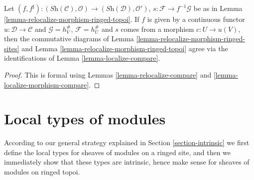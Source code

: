 \begin{lemma}
\label{lemma-relocalize-morphism-compare}
Let
$(f, f^\sharp) :
(\textit{Sh}(\mathcal{C}), \mathcal{O})
\to
(\textit{Sh}(\mathcal{D}), \mathcal{O}')$,
$s : \mathcal{F} \to f^{-1}\mathcal{G}$ be as in
Lemma \ref{lemma-relocalize-morphism-ringed-topoi}.
If $f$ is given by a continuous functor
$u : \mathcal{D} \to \mathcal{C}$
and $\mathcal{G} = h_V^\#$,
$\mathcal{F} = h_U^\#$ and $s$ comes from a morphism
$c : U \to u(V)$, then
the commutative diagrams of
Lemma \ref{lemma-relocalize-morphism-ringed-sites}
and
Lemma \ref{lemma-relocalize-morphism-ringed-topoi}
agree via the identifications of
Lemma \ref{lemma-localize-compare}.
\end{lemma}

\begin{proof}
This is formal using
Lemmas \ref{lemma-relocalize-compare} and
\ref{lemma-localize-morphism-compare}.
\end{proof}

















\section{Local types of modules}
\label{section-local}

\noindent
According to our general strategy explained in Section \ref{section-intrinsic}
we first define the local types for sheaves of modules on a ringed site, and
then we immediately show that these types are intrinsic, hence make sense
for sheaves of modules on ringed topoi.

